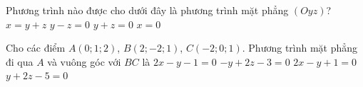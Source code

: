 \begin{ex}%
	Phương trình nào được cho dưới đây là phương trình mặt phẳng $(Oyz)$?
	\choice
	{$x=y+z$}
	{$y-z=0$}
	{$y+z=0$}
	{\True $x=0$}
\end{ex}

\begin{ex}%
	Cho các điểm $A(0;1;2)$, $B(2;- 2;1)$, $C(- 2;0;1)$. Phương trình mặt phẳng đi qua $A$ và vuông góc với $BC$ là
	\choice
	{$2x - y - 1 = 0$}
	{$ - y + 2z - 3 = 0$}
	{\True $2x - y + 1 = 0$}
	{$y + 2z - 5 = 0$}
\end{ex}

